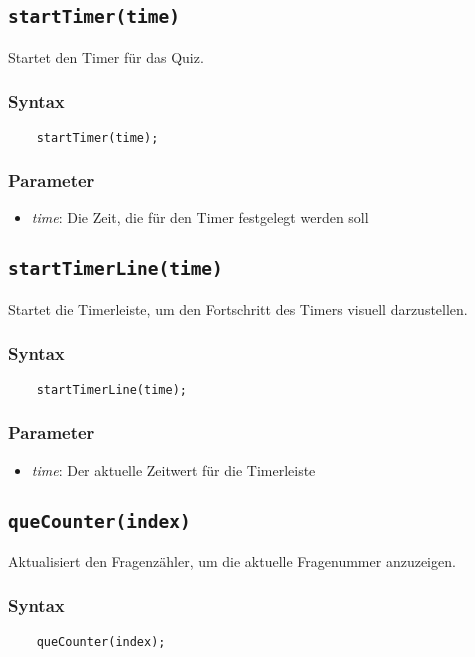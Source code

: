 \documentclass[10pt, fleqn]{scrartcl}
\begin{document}
\subsection{\texttt{startTimer(time)}}
Startet den Timer für das Quiz.

\subsubsection*{Syntax}
\begin{lstlisting}
	startTimer(time);
\end{lstlisting}

\subsubsection*{Parameter}
\begin{itemize}
	\item \textit{time}: Die Zeit, die für den Timer festgelegt werden soll
\end{itemize}

\subsection{\texttt{startTimerLine(time)}}
Startet die Timerleiste, um den Fortschritt des Timers visuell darzustellen.

\subsubsection*{Syntax}
\begin{lstlisting}
	startTimerLine(time);
\end{lstlisting}

\subsubsection*{Parameter}
\begin{itemize}
	\item \textit{time}: Der aktuelle Zeitwert für die Timerleiste
\end{itemize}

\subsection{\texttt{queCounter(index)}}
Aktualisiert den Fragenzähler, um die aktuelle Fragenummer anzuzeigen.

\subsubsection*{Syntax}
\begin{lstlisting}
	queCounter(index);
\end{lstlisting}
\end{document}
